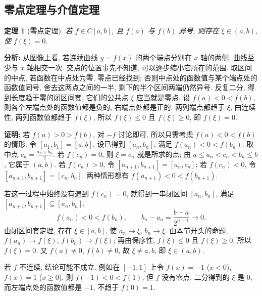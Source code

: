 \documentclass[UTF8,openany]{ctexbook}
\theoremstyle{chinesetextbook}
\newtheorem{theorem}{定理}[section]
\newenvironment{cnproof}{\par\indent\textbf{证明:} \ignorespaces}{\par}
\begin{document}
\subsection{零点定理与介值定理}
\begin{theorem}[零点定理]
若 $f\in C[a,b]$, 且 $f(a)$ 与 $f(b)$ 异号, 则存在 $\xi\in(a,b)$, 使 $f(\xi)=0$.
\end{theorem}
\par\indent\textbf{分析:} 从图像上看, 若连续曲线 $y=f(x)$ 的两个端点分别在 $x$ 轴的两侧, 曲线至少与 $x$ 轴相交一次. 交点的位置事先不知道, 可以逐步缩小它所在的范围. 取区间的中点, 若函数在中点处为零, 零点已经找到; 否则中点处的函数值与某个端点处的函数值同号, 舍去这两点之间的一半, 剩下的半个区间两端仍然异号. 反复二分, 得到长度趋于零的闭区间套, 它们的公共点 $\xi$ 应当就是零点. 设 $f(a)<0<f(b)$, 则各个左端点处的函数值都是负的, 右端点处都是正的. 两列端点都趋于 $\xi$, 由连续性, 两列函数值都趋于 $f(\xi)$, 所以 $f(\xi)\le0$ 且 $f(\xi)\ge0$, 即 $f(\xi)=0$.
\begin{cnproof}
若 $f(a)>0>f(b)$, 对 $-f$ 讨论即可, 所以只需考虑 $f(a)<0<f(b)$ 的情形. 令 $[a_1,b_1]=[a,b]$. 设已得到 $[a_n,b_n]$, 满足 $f(a_n)<0<f(b_n)$. 取中点 $\displaystyle c_n=\frac{a_n+b_n}2$. 若 $f(c_n)=0$, 则 $\xi=c_n$ 就是所求的点; 由 $a\le a_n<c_n<b_n\le b$, 它属于 $(a,b)$. 若 $f(c_n)>0$, 令 $[a_{n+1},b_{n+1}]=[a_n,c_n]$; 若 $f(c_n)<0$, 令 $[a_{n+1},b_{n+1}]=[c_n,b_n]$. 两种情形都有 $f(a_{n+1})<0<f(b_{n+1})$.

若这一过程中始终没有遇到 $f(c_n)=0$, 就得到一串闭区间 $[a_n,b_n]$, 满足 $[a_{n+1},b_{n+1}]\subseteq[a_n,b_n]$,
\[
f(a_n)<0<f(b_n),\qquad b_n-a_n=\frac{b-a}{2^{n-1}}\to0.
\]
由闭区间套定理, 存在 $\xi\in[a,b]$, 使 $a_n\to\xi$, $b_n\to\xi$. 由本节开头的命题, $f(a_n)\to f(\xi)$, $f(b_n)\to f(\xi)$; 再由保序性, $f(\xi)\le0$ 且 $f(\xi)\ge0$, 所以 $f(\xi)=0$. 又 $f(a)\ne0$, $f(b)\ne0$, 故 $\xi\ne a,b$, 即 $\xi\in(a,b)$.
\end{cnproof}
若 $f$ 不连续, 结论可能不成立. 例如在 $[-1,1]$ 上令 $f(x)=-1$ ($x<0$), $f(x)=1$ ($x\ge0$), 则 $f(-1)<0<f(1)$, 但 $f$ 没有零点. 二分得到的 $\xi$ 是 $0$, 而左端点处的函数值都是 $-1$, 不趋于 $f(0)=1$.
\end{document}
